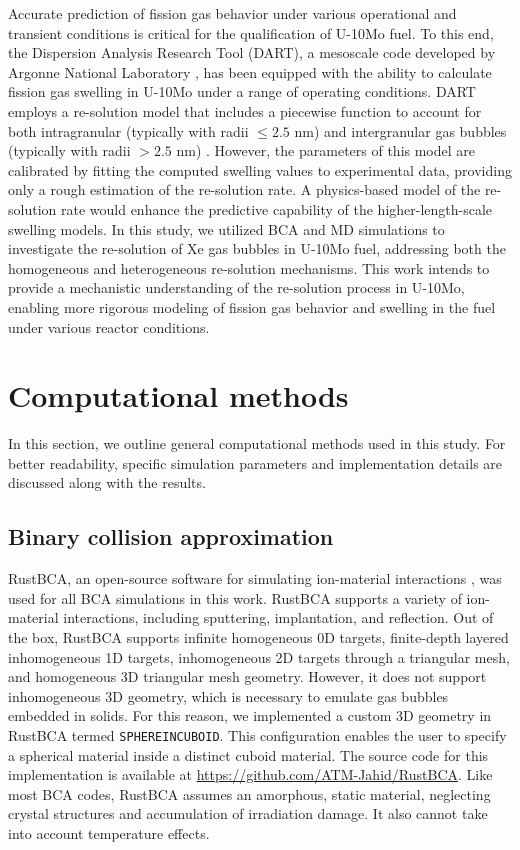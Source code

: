 \documentclass[review]{elsarticle}
\begin{document}
Accurate prediction of fission gas behavior under various operational and transient conditions is critical for the qualification of U-10Mo fuel. To this end, the Dispersion Analysis Research Tool (DART), a mesoscale code developed by Argonne National Laboratory \cite{ye2023}, has been equipped with the ability to calculate fission gas swelling in U-10Mo under a range of operating conditions. DART employs a re-solution model that includes a piecewise function to account for both intragranular (typically with radii $\le 2.5$ nm) and intergranular gas bubbles (typically with radii $> 2.5$ nm) \cite{kim2008}. However, the parameters of this model are calibrated by fitting the computed swelling values to experimental data, providing only a rough estimation of the re-solution rate. A physics-based model of the re-solution rate would enhance the predictive capability of the higher-length-scale swelling models. In this study, we utilized BCA and MD simulations to investigate the re-solution of Xe gas bubbles in U-10Mo fuel, addressing both the homogeneous and heterogeneous re-solution mechanisms. This work intends to provide a mechanistic understanding of the re-solution process in U-10Mo, enabling more rigorous modeling of fission gas behavior and swelling in the fuel under various reactor conditions.


\section{Computational methods}

In this section, we outline general computational methods used in this study. For better readability, specific simulation parameters and implementation details are discussed along with the results.

\subsection{Binary collision approximation}

RustBCA, an open-source software for simulating ion-material interactions \cite{drobny2021}, was used for all BCA simulations in this work. RustBCA supports a variety of ion-material interactions, including sputtering, implantation, and reflection. Out of the box, RustBCA supports infinite homogeneous 0D targets, finite-depth layered inhomogeneous 1D targets, inhomogeneous 2D targets through a triangular mesh, and homogeneous 3D triangular mesh geometry. However, it does not support inhomogeneous 3D geometry, which is necessary to emulate gas bubbles embedded in solids. For this reason, we implemented a custom 3D geometry in RustBCA termed \texttt{SPHEREINCUBOID}. This configuration enables the user to specify a spherical material inside a distinct cuboid material. The source code for this implementation is available at \url{https://github.com/ATM-Jahid/RustBCA}. Like most BCA codes, RustBCA assumes an amorphous, static material, neglecting crystal structures and accumulation of irradiation damage. It also cannot take into account temperature effects.
\end{document}
